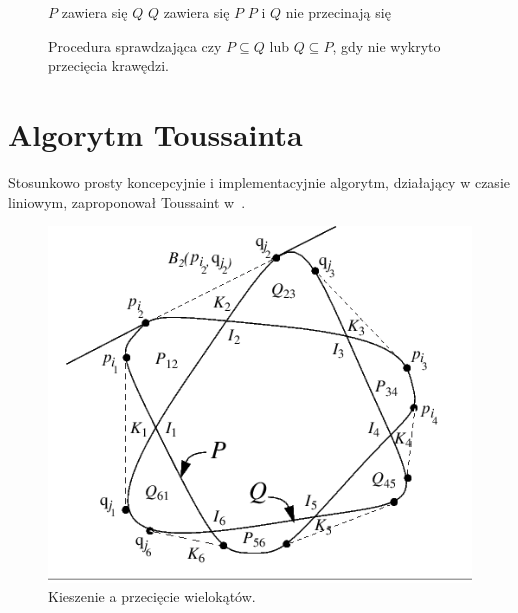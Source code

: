 \begin{figure}
  \begin{algorithmic}[1]
    \State $P$ zawiera się $Q$
    \Else
    \State $Q$ zawiera się $P$
    \Else
    \State $P$ i $Q$ nie przecinają się
    \EndIf
    \EndIf
  \end{algorithmic}
  \caption{\label{alg:OrourkeFinalTerms} Procedura sprawdzająca czy $P
    \subseteq Q$ lub $Q \subseteq P$, gdy nie wykryto przecięcia
    krawędzi.}
\end{figure}

\section{Algorytm Toussainta}
Stosunkowo prosty koncepcyjnie i implementacyjnie algorytm, działający
w czasie liniowym, zaproponował Toussaint w~\cite{ToussaintInt}.

\begin{figure}[htb]
  \centering
  \includegraphics[scale=0.7]{img/toussaint1}
  \caption{\label{img:toussaint1} Kieszenie a przecięcie wielokątów.}
\end{figure}

